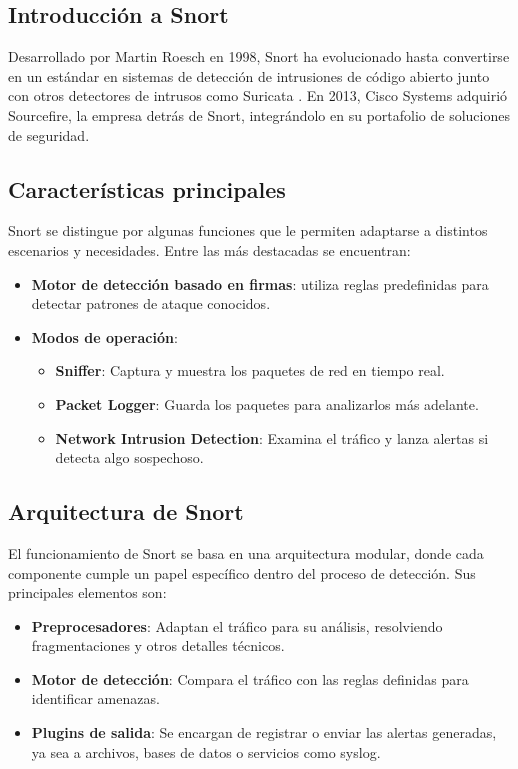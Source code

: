 \documentclass[11pt,a4paper,twoside]{report}
\begin{document}
\subsection{Introducción a Snort}

Desarrollado por Martin Roesch en 1998, Snort ha evolucionado hasta convertirse en un estándar en sistemas de detección de intrusiones de código abierto junto con otros detectores de intrusos como Suricata \cite{suricata_official}. En 2013, Cisco Systems adquirió Sourcefire, la empresa detrás de Snort, integrándolo en su portafolio de soluciones de seguridad.

\subsection{Características principales}

Snort se distingue por algunas funciones que le permiten adaptarse a distintos escenarios y necesidades. Entre las más destacadas se encuentran:

\begin{itemize}
	\item \textbf{Motor de detección basado en firmas}: utiliza reglas predefinidas para detectar patrones de ataque conocidos.
	\item \textbf{Modos de operación}:
	\begin{itemize}
		\item \textbf{Sniffer}: Captura y muestra los paquetes de red en tiempo real.
		\item \textbf{Packet Logger}: Guarda los paquetes para analizarlos más adelante.
		\item \textbf{Network Intrusion Detection}: Examina el tráfico y lanza alertas si detecta algo sospechoso.
	\end{itemize}
\end{itemize}

\subsection{Arquitectura de Snort}

El funcionamiento de Snort se basa en una arquitectura modular, donde cada componente cumple un papel específico dentro del proceso de detección. Sus principales elementos son:

\begin{itemize}
	\item \textbf{Preprocesadores}: Adaptan el tráfico para su análisis, resolviendo fragmentaciones y otros detalles técnicos.
	\item \textbf{Motor de detección}: Compara el tráfico con las reglas definidas para identificar amenazas.
	\item \textbf{Plugins de salida}: Se encargan de registrar o enviar las alertas generadas, ya sea a archivos, bases de datos o servicios como syslog.
\end{itemize}
\end{document}
